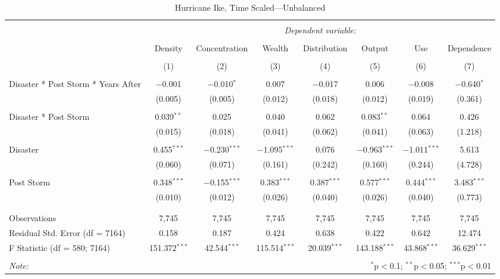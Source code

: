 
\begin{table}[!htbp] \centering 
  \caption{Hurricane Ike, Time Scaled---Unbalanced} 
  \label{} 
\footnotesize 
\begin{tabular}{@{\extracolsep{5pt}}lccccccc} 
\\[-1.8ex]\hline 
\hline \\[-1.8ex] 
 & \multicolumn{7}{c}{\textit{Dependent variable:}} \\ 
\cline{2-8} 
\\[-1.8ex] & Density & Concentration & Wealth & Distribution & Output & Use & Dependence \\ 
\\[-1.8ex] & (1) & (2) & (3) & (4) & (5) & (6) & (7)\\ 
\hline \\[-1.8ex] 
 Disaster * Post Storm * Years After & $-$0.001 & $-$0.010$^{*}$ & 0.007 & $-$0.017 & 0.006 & $-$0.008 & $-$0.640$^{*}$ \\ 
  & (0.005) & (0.005) & (0.012) & (0.018) & (0.012) & (0.019) & (0.361) \\ 
  & & & & & & & \\ 
 Disaster * Post Storm & 0.039$^{**}$ & 0.025 & 0.040 & 0.062 & 0.083$^{**}$ & 0.064 & 0.426 \\ 
  & (0.015) & (0.018) & (0.041) & (0.062) & (0.041) & (0.063) & (1.218) \\ 
  & & & & & & & \\ 
 Disaster & 0.455$^{***}$ & $-$0.230$^{***}$ & $-$1.095$^{***}$ & 0.076 & $-$0.963$^{***}$ & $-$1.011$^{***}$ & 5.613 \\ 
  & (0.060) & (0.071) & (0.161) & (0.242) & (0.160) & (0.244) & (4.728) \\ 
  & & & & & & & \\ 
 Post Storm & 0.348$^{***}$ & $-$0.155$^{***}$ & 0.383$^{***}$ & 0.387$^{***}$ & 0.577$^{***}$ & 0.444$^{***}$ & 3.483$^{***}$ \\ 
  & (0.010) & (0.012) & (0.026) & (0.040) & (0.026) & (0.040) & (0.773) \\ 
  & & & & & & & \\ 
\hline \\[-1.8ex] 
Observations & 7,745 & 7,745 & 7,745 & 7,745 & 7,745 & 7,745 & 7,745 \\ 
Residual Std. Error (df = 7164) & 0.158 & 0.187 & 0.424 & 0.638 & 0.422 & 0.642 & 12.474 \\ 
F Statistic (df = 580; 7164) & 151.372$^{***}$ & 42.544$^{***}$ & 115.514$^{***}$ & 20.039$^{***}$ & 143.188$^{***}$ & 43.868$^{***}$ & 36.629$^{***}$ \\ 
\hline 
\hline \\[-1.8ex] 
\textit{Note:}  & \multicolumn{7}{r}{$^{*}$p$<$0.1; $^{**}$p$<$0.05; $^{***}$p$<$0.01} \\ 
\end{tabular} 
\end{table} 

